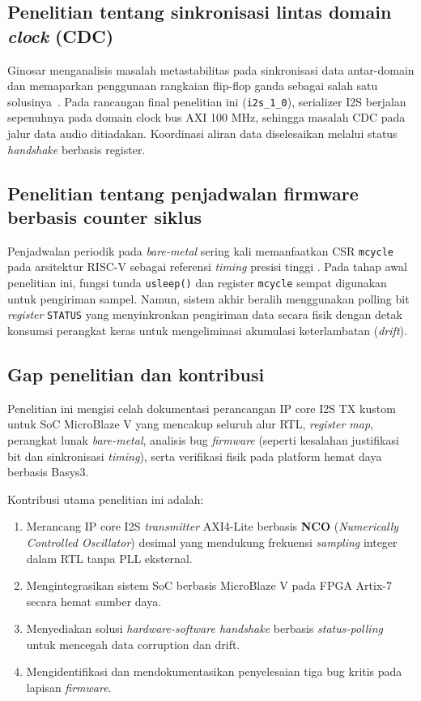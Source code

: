 \subsection{Penelitian tentang sinkronisasi lintas domain \textit{clock} (CDC)}

Ginosar menganalisis masalah metastabilitas pada sinkronisasi data antar-domain dan memaparkan penggunaan rangkaian flip-flop ganda sebagai salah satu solusinya~\citep{ginosar_metastability_2011}. Pada rancangan final penelitian ini (\texttt{i2s\_1\_0}), serializer I2S berjalan sepenuhnya pada domain clock bus AXI 100 MHz, sehingga masalah CDC pada jalur data audio ditiadakan. Koordinasi aliran data diselesaikan melalui status \textit{handshake} berbasis register.

\subsection{Penelitian tentang penjadwalan firmware berbasis counter siklus}

Penjadwalan periodik pada \textit{bare-metal} sering kali memanfaatkan CSR \texttt{mcycle} pada arsitektur RISC-V sebagai referensi \textit{timing} presisi tinggi \citep{riscv_isa_vol1_2019}. Pada tahap awal penelitian ini, fungsi tunda \texttt{usleep()} dan register \texttt{mcycle} sempat digunakan untuk pengiriman sampel. Namun, sistem akhir beralih menggunakan polling bit \textit{register} \texttt{STATUS} yang menyinkronkan pengiriman data secara fisik dengan detak konsumsi perangkat keras untuk mengeliminasi akumulasi keterlambatan (\textit{drift}).

\subsection{Gap penelitian dan kontribusi}

Penelitian ini mengisi celah dokumentasi perancangan IP core I2S TX kustom untuk SoC MicroBlaze V yang mencakup seluruh alur RTL, \textit{register map}, perangkat lunak \textit{bare-metal}, analisis bug \textit{firmware} (seperti kesalahan justifikasi bit dan sinkronisasi \textit{timing}), serta verifikasi fisik pada platform hemat daya berbasis Basys3. 

Kontribusi utama penelitian ini adalah:
\begin{enumerate}
    \item Merancang IP core I2S \textit{transmitter} AXI4-Lite berbasis \textbf{NCO} (\textit{Numerically Controlled Oscillator}) desimal yang mendukung frekuensi \textit{sampling} integer dalam RTL tanpa PLL eksternal.
    \item Mengintegrasikan sistem SoC berbasis MicroBlaze V pada FPGA Artix-7 secara hemat sumber daya.
    \item Menyediakan solusi \textit{hardware-software handshake} berbasis \textit{status-polling} untuk mencegah data corruption dan drift.
    \item Mengidentifikasi dan mendokumentasikan penyelesaian tiga bug kritis pada lapisan \textit{firmware}.
\end{enumerate}

